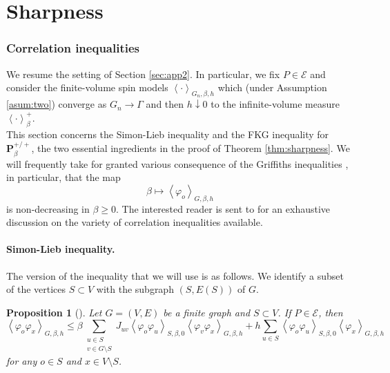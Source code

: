 \documentclass{article}
\newtheorem{proposition}[theorem]{Proposition}
\numberwithin{equation}{section}
\theoremstyle{definition}
\theoremstyle{definition}
\theoremstyle{remark}
\newcommand\vp{\varphi}
\newcommand\Ec{\mathcal{E}}
\renewcommand{\P}{\mathrm{\mathbf{P}}}
\newcommand{\G}{\Gamma}
\begin{document}
\part{Sharpness}\label{part:2}

\section{Correlation inequalities}\label{sec:corrineq}
We resume the setting of Section \ref{sec:app2}. In particular, we fix $P \in \Ec$ and consider the finite-volume spin models $\left< \cdot \right>_{G_n,\beta,h}$ which (under Assumption \ref{asum:two}) converge as $G_n \to \G$ and then $h \downarrow 0$ to the infinite-volume measure $\left< \cdot \right>_{\beta}^{+}$. 
\\[1em]
\noindent This section concerns the Simon-Lieb inequality and the FKG inequality for $\P^{+ / +}_\beta$, the two essential ingredients in the proof of Theorem \ref{thm:sharpness}. 
We will frequently take for granted various consequence of the Griffiths inequalities \cite{GriffithsCor,Gin}, in particular, that the map 
\[
\beta \mapsto \left< \vp_o \right>_{G,\beta,h}
\]
is non-decreasing in $\beta \geq 0$. 
The interested reader is sent to \cite[Chapter 2]{simon2026phase} for an exhaustive discussion on the variety of correlation inequalities available.
\subsection{Simon-Lieb inequality. }
The version of the inequality that we will use is as follows.
We identify a subset of the vertices $S \subset V$ with the subgraph $(S,E(S))$ of $G$.

\begin{proposition}[] Let $G = (V,E)$ be a finite graph and $S \subset V$. If $P \in \Ec$, then
	\[
		\left< \vp_o \vp_x \right>_{G,\beta,h} \leq \beta \sum_{\substack{u \in S \\ v \in G \setminus S}} J_{uv} \left< \vp_o \vp_u \right>_{S,\beta,0} \left< \vp_v \vp_x \right>_{G,\beta,h} + h \sum_{u \in S} \left< \vp_o \vp_u \right>_{S,\beta,0} \left< \vp_x \right>_{G,\beta,h} 
	\] 
	for any $o \in S$ and $x \in V \setminus S$.
\end{proposition}
\end{document}
